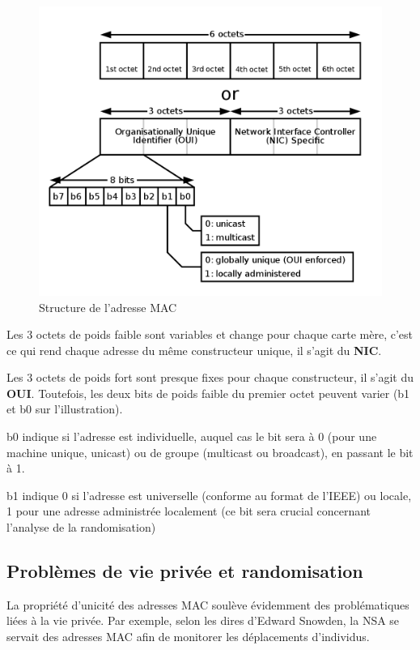 \begin{figure}[H]
	\centering
	\includegraphics[width=12cm]{images/probe/mac_struc.png}
	\caption{Structure de l'adresse MAC}
	\label{fig:macstruct}
\end{figure}

Les 3 octets de poids faible sont variables et change pour chaque carte mère, c'est ce qui rend chaque adresse du même
constructeur unique, il s'agit du \textbf{NIC}.

Les 3 octets de poids fort sont presque fixes pour chaque constructeur, il s'agit du \textbf{OUI}.
Toutefois, les deux bits de poids faible du premier octet peuvent varier (b1 et b0 sur l'illustration).

b0 indique si l'adresse est individuelle, auquel cas le bit sera à 0 (pour une machine unique, unicast) 
ou de groupe (multicast ou broadcast), en passant le bit à 1.

b1 indique 0 si l'adresse est universelle (conforme au format de l'IEEE) ou 
locale, 1 pour une adresse administrée localement (ce bit sera crucial concernant l'analyse de la randomisation)

\subsection{Problèmes de vie privée et randomisation}
La propriété d'unicité des adresses MAC soulève évidemment des problématiques liées à la vie privée. 
Par exemple, selon les dires d'Edward Snowden, la NSA se servait des adresses MAC afin de
monitorer les déplacements d'individus.~\cite{hackernews:snowdan}

